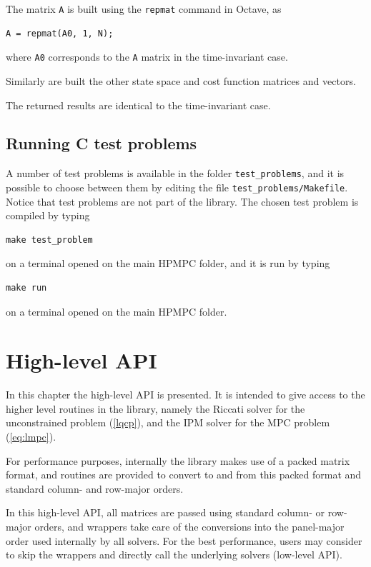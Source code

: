 \documentclass[a4paper]{report}
\begin{document}
The matrix {\tt A} is built using the {\tt repmat} command in Octave, as
\begin{verbatim}
A = repmat(A0, 1, N);
\end{verbatim}
where {\tt A0} corresponds to the {\tt A} matrix in the time-invariant case.

Similarly are built the other state space and cost function matrices and vectors.

The returned results are identical to the time-invariant case.


\section{Running C test problems}

A number of test problems is available in the folder {\tt test\_problems}, and it is possible to choose between them by editing the file {\tt test\_problems/Makefile}.
Notice that test problems are not part of the library.
The chosen test problem is compiled by typing
\begin{verbatim}
make test_problem
\end{verbatim}
on a terminal opened on the main HPMPC folder, and it is run by typing
\begin{verbatim}
make run 
\end{verbatim}
on a terminal opened on the main HPMPC folder.



\chapter{High-level API}

In this chapter the high-level API is presented. 
It is intended to give access to the higher level routines in the library, namely the Riccati solver for the unconstrained problem (\ref{lqcp}), and the IPM solver for the MPC problem (\ref{eq:lmpc}).

For performance purposes, internally the library makes use of a packed matrix format, and routines are provided to convert to and from this packed format and standard column- and row-major orders.

In this high-level API, all matrices are passed using standard column- or row-major orders, and wrappers take care of the conversions into the panel-major order used internally by all solvers.
For the best performance, users may consider to skip the wrappers and directly call the underlying solvers (low-level API).
\end{document}
